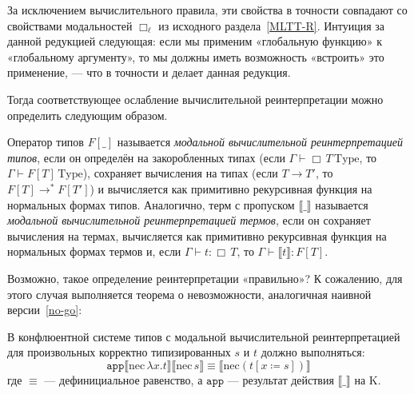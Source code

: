 За исключением вычислительного правила, эти свойства в
точности совпадают со свойствами модальностей
$\Box_\ell$ из исходного раздела~\ref{MLTT-R}. Интуиция
за данной редукцией следующая: если мы применим
«глобальную функцию» к «глобальному аргументу», то мы
должны иметь возможность «встроить» это применение, ---
что в точности и делает данная редукция.

Тогда соответствующее ослабление вычислительной
реинтерпретации можно определить следующим образом.

\begin{definition}
    Оператор типов $F[\_]$ называется \emph{модальной
    вычислительной реинтерпретацией типов}, если он
    определён на закоробленных типах (если
    $\Gamma\vdash\Box\,T\,\mathrm{Type}$, то
    $\Gamma\vdash F[T]\,\mathrm{Type}$), сохраняет
    вычисления на типах (если $T\to T'$, то
    $F[T]\to^* F[T']$) и вычисляется как примитивно
    рекурсивная функция на нормальных формах типов.
    Аналогично, терм с пропуском
    $\llbracket\_\rrbracket$ называется \emph{модальной
    вычислительной реинтерпретацией термов}, если он
    сохраняет вычисления на термах, вычисляется как
    примитивно рекурсивная функция на нормальных формах
    термов и, если $\Gamma\vdash t:\Box\,T$, то
    $\Gamma\vdash\llbracket t\rrbracket:F[T]$.
\end{definition}

Возможно, такое определение реинтерпретации
«правильно»? К сожалению, для этого случая выполняется
теорема о невозможности, аналогичная наивной
версии~\ref{no-go}:

\begin{theorem}
    В конфлюентной системе типов с модальной
    вычислительной реинтерпретацией для произвольных
    корректно типизированных $s$ и $t$ должно
    выполняться:
    \[
    \mathtt{app}\llbracket\mathrm{nec}\,\lambda x.t
    \rrbracket\llbracket\mathrm{nec}\,s\rrbracket
    \equiv\llbracket\mathrm{nec}(t[x\coloneqq s])
    \rrbracket
    \]
    где $\equiv$ --- дефинициальное равенство, а
    $\mathtt{app}$ --- результат действия
    $\llbracket\_\rrbracket$ на $\mathrm{K}$.
\end{theorem}


